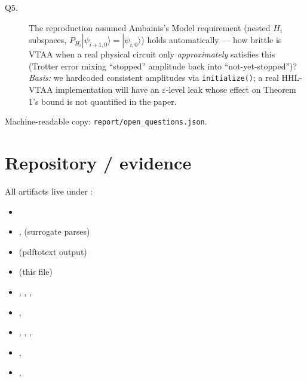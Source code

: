 \documentclass[11pt]{article}
\begin{document}
\begin{description}
\item[Q5.] The reproduction assumed Ambainis's Model requirement
(nested $H_i$ subspaces, $P_{H_i} |\psi_{i+1,0}\rangle = |\psi_{i,0}\rangle$)
holds automatically --- how brittle is VTAA when a real physical circuit
only \emph{approximately} satisfies this (Trotter error mixing ``stopped''
amplitude back into ``not-yet-stopped'')? \emph{Basis:} we hardcoded
consistent amplitudes via \texttt{initialize()}; a real HHL-VTAA implementation
will have an $\varepsilon$-level leak whose effect on Theorem 1's bound is
not quantified in the paper.
\end{description}

Machine-readable copy: \texttt{report/open\_questions.json}.

\section*{Repository / evidence}

All artifacts live under
:

\begin{itemize}
\item {}
\item {},  (surrogate parses)
\item {} (pdftotext output)
\item {} (this file)
\item {}, ,
      , 
\item {}, 
\item {}, ,
      , 
\item {},
\item {}, 
\end{itemize}
\end{document}
